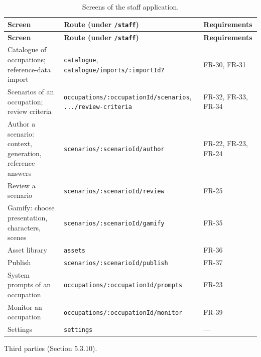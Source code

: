 {\small{}\renewcommand{\arraystretch}{1.1}
\begin{longtable}{|>{\raggedright\arraybackslash}p{}|>{\raggedright\arraybackslash}p{}|>{\raggedright\arraybackslash}p{}|}
\caption{Screens of the staff application.} \\
\hline
\textbf{Screen} & \textbf{Route (under \texttt{/\allowbreak{}staff})} & \textbf{Requirements} \\ \hline
\endfirsthead
\hline
\textbf{Screen} & \textbf{Route (under \texttt{/\allowbreak{}staff})} & \textbf{Requirements} \\ \hline
\endhead
Catalogue of occupations; reference-\allowbreak{}data import & \texttt{catalogue}, \texttt{catalogue/\allowbreak{}imports/\allowbreak{}:importId?} & FR-30, FR-31 \\ \hline
Scenarios of an occupation; review criteria & \texttt{occupations/\allowbreak{}:occupationId/\allowbreak{}scenarios}, \texttt{.\allowbreak{}.\allowbreak{}.\allowbreak{}/\allowbreak{}review-\allowbreak{}criteria} & FR-32, FR-33, FR-34 \\ \hline
Author a scenario: context, generation, reference answers & \texttt{scenarios/\allowbreak{}:scenarioId/\allowbreak{}author} & FR-22, FR-23, FR-24 \\ \hline
Review a scenario & \texttt{scenarios/\allowbreak{}:scenarioId/\allowbreak{}review} & FR-25 \\ \hline
Gamify: choose presentation, characters, scenes & \texttt{scenarios/\allowbreak{}:scenarioId/\allowbreak{}gamify} & FR-35 \\ \hline
Asset library & \texttt{assets} & FR-36 \\ \hline
Publish & \texttt{scenarios/\allowbreak{}:scenarioId/\allowbreak{}publish} & FR-37 \\ \hline
System prompts of an occupation & \texttt{occupations/\allowbreak{}:occupationId/\allowbreak{}prompts} & FR-23 \\ \hline
Monitor an occupation & \texttt{occupations/\allowbreak{}:occupationId/\allowbreak{}monitor} & FR-39 \\ \hline
Settings & \texttt{settings} & --- \\ \hline
\end{longtable}
}

Third parties (Section 5.3.10).

